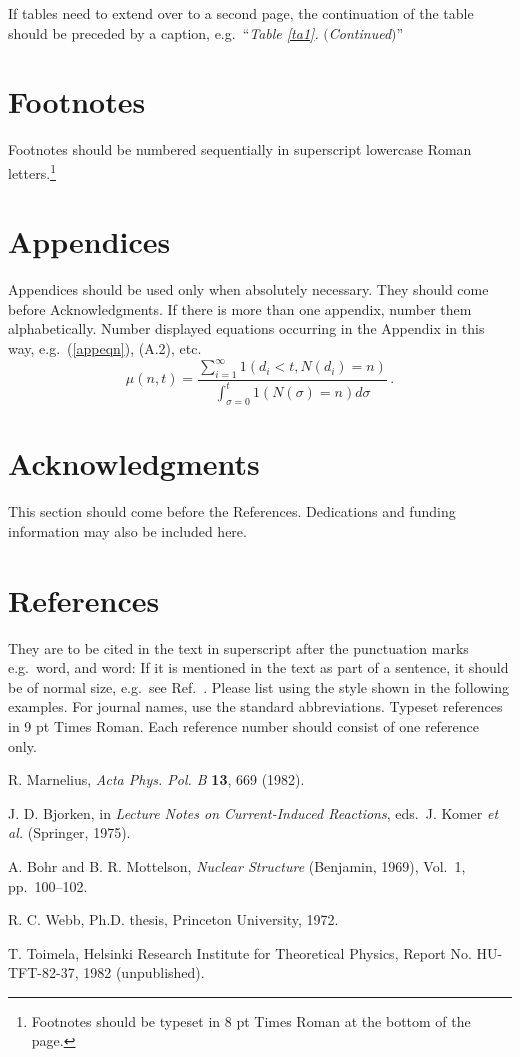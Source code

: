 \documentclass{ws-mpla}
\begin{document}
If tables need to extend over to a second page, the continuation
of the table should be preceded by a caption,
e.g.~``{\it Table \ref{ta1}.} $(${\it Continued}$)$''

\section{Footnotes}

Footnotes should be numbered sequentially in superscript
lowercase Roman letters.\footnote{Footnotes should be
typeset in 8 pt Times Roman at the bottom of the page.}

\appendix

\section{Appendices}

Appendices should be used only when absolutely necessary. They
should come before Acknowledgments. If there is more than one
appendix, number them alphabetically. Number displayed equations
occurring in the Appendix in this way, e.g.~(\ref{appeqn}), (A.2),
etc.
\begin{equation}
\mu(n, t) = \frac{\sum^\infty_{i=1} 1(d_i < t, N(d_i)
= n)}{\int^t_{\sigma=0} 1(N(\sigma) = n)d\sigma}\,.
\label{appeqn}
\end{equation}

\section*{Acknowledgments}

This section should come before the References. Dedications and funding
information may also be included here.

\section*{References}

They are to be cited in the text in superscript
after the punctuation marks e.g.~word,\cite{Marnelius} and word:\cite{Bjorken}
If it is mentioned in the text as part of a sentence, it should be of normal size,
e.g.~see Ref.~. Please list using the style shown in the following examples.
For journal names, use the standard abbreviations. Typeset references in 9 pt Times Roman.
Each reference number should consist of one reference only.

\begin{thebibliography}{0}
 R. Marnelius, {\it Acta Phys. Pol. B} {\bf 13},
669 (1982).

 J. D. Bjorken, in {\it Lecture Notes on Current-Induced
Reactions}, eds.~J. Komer {\it et al.} (Springer, 1975).

 A. Bohr and B. R. Mottelson, {\it Nuclear Structure}
(Benjamin, 1969), Vol.~1, pp.~100--102.

 R. C. Webb, Ph.D. thesis, Princeton University, 1972.

 T. Toimela, Helsinki Research Institute for
Theoretical Physics, Report No. HU-TFT-82-37, 1982 (unpublished).
\end{thebibliography}
\end{document}
